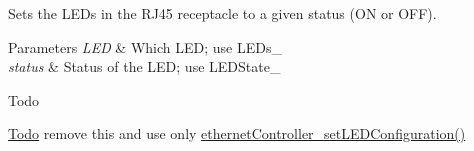 Sets the L\+E\+Ds in the R\+J45 receptacle to a given status (ON or O\+FF). 


\begin{DoxyParams}{Parameters}
{\em L\+ED} & Which L\+ED; use L\+E\+Ds\+\_\+ \\
\hline
{\em status} & Status of the L\+ED; use L\+E\+D\+State\+\_\+ \\
\hline
\end{DoxyParams}
\begin{DoxyRefDesc}{Todo}
\item[\mbox{\hyperlink{todo__todo000013}{Todo}}]remove this and use only \mbox{\hyperlink{group__leds_ga3ec0343a266cb8a4925097d708dd96f4}{ethernet\+Controller\+\_\+set\+L\+E\+D\+Configuration()}} \end{DoxyRefDesc}
